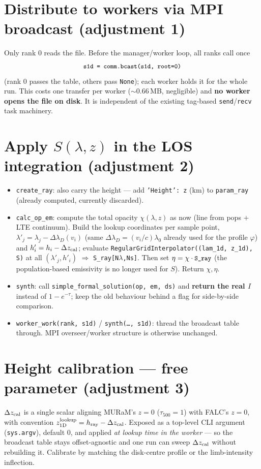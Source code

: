 \documentclass[10pt]{article}
\newcommand{\code}[1]{\texttt{\small #1}}
\begin{document}
\section{Distribute to workers via MPI broadcast \small(adjustment 1)}
Only rank 0 reads the file. Before the manager/worker loop, all ranks call once
\[
  \code{s1d = comm.bcast(s1d, root=0)}
\]
(rank 0 passes the table, others pass \code{None}); each worker holds it for the
whole run. This costs one transfer per worker ($\sim$0.66\,MB, negligible) and
\textbf{no worker opens the file on disk}. It is independent of the existing
tag-based \code{send}/\code{recv} task machinery.

\section{Apply $S(\lambda,z)$ in the LOS integration \small(adjustment 2)}
\begin{itemize}
  \item \code{create\_ray}: also carry the height --- add \code{'Height': z} (km)
    to \code{param\_ray} (already computed, currently discarded).
  \item \code{calc\_op\_em}: compute the total opacity $\chi(\lambda,z)$ as now
    (line from pops $+$ LTE continuum). Build the lookup coordinates per sample
    point, $\lambda'_j=\lambda_j-\Delta\lambda_D(v_i)$ (same
    $\Delta\lambda_D=(v_i/c)\lambda_0$ already used for the profile $\varphi$) and
    $h'_i=h_i-\Delta z_{\rm cal}$; evaluate
    \code{RegularGridInterpolator((lam\_1d, z\_1d), S)} at all $(\lambda'_j,h'_i)$
    $\Rightarrow$ \code{S\_ray[N$\lambda$,Ns]}. Then set
    $\eta=\chi\cdot\code{S\_ray}$ (the population-based emissivity is no longer
    used for $S$). Return $\chi,\eta$.
  \item \code{synth}: call \code{simple\_formal\_solution(op, em, ds)} and
    \textbf{return the real $I$} instead of $1-e^{-\tau}$; keep the old behaviour
    behind a flag for side-by-side comparison.
  \item \code{worker\_work(rank, s1d)} / \code{synth(\dots, s1d)}: thread the
    broadcast table through. MPI overseer/worker structure is otherwise unchanged.
\end{itemize}

\section{Height calibration --- free parameter \small(adjustment 3)}
$\Delta z_{\rm cal}$ is a single scalar aligning MURaM's $z=0$ ($\tau_{500}{=}1$)
with FALC's $z=0$, with convention $z_{\rm 1D}^{\rm lookup}=h_{\rm ray}-\Delta
z_{\rm cal}$. Exposed as a top-level CLI argument (\code{sys.argv}), default $0$,
and applied \emph{at lookup time in the worker} --- so the broadcast table stays
offset-agnostic and one run can sweep $\Delta z_{\rm cal}$ without rebuilding it.
Calibrate by matching the disk-centre profile or the limb-intensity inflection.
\end{document}
